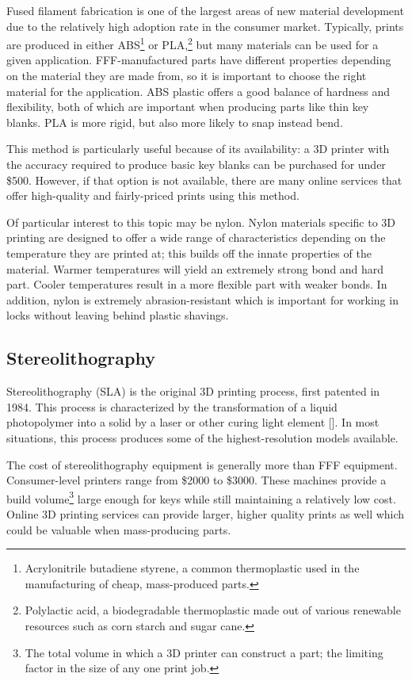 \documentclass{acm_proc_article-sp}
\begin{document}
Fused filament fabrication is one of the largest areas of new material development due to the relatively high adoption rate in the consumer market. Typically, prints are produced in either ABS\footnote{Acrylonitrile butadiene styrene, a common thermoplastic used in the manufacturing of cheap, mass-produced parts.} or PLA,\footnote{Polylactic acid, a biodegradable thermoplastic made out of various renewable resources such as corn starch and sugar cane.} but many materials can be used for a given application. FFF-manufactured parts have different properties depending on the material they are made from, so it is important to choose the right material for the application. ABS plastic offers a good balance of hardness and flexibility, both of which are important when producing parts like thin key blanks. PLA is more rigid, but also more likely to snap instead bend.

This method is particularly useful because of its availability: a 3D printer with the accuracy required to produce basic key blanks can be purchased for under \$500. However, if that option is not available, there are many online services that offer high-quality and fairly-priced prints using this method.

Of particular interest to this topic may be nylon. Nylon materials specific to 3D printing are designed to offer a wide range of characteristics depending on the temperature they are printed at; this builds off the innate properties of the material. Warmer temperatures will yield an extremely strong bond and hard part. Cooler temperatures result in a more flexible part with weaker bonds. In addition, nylon is extremely abrasion-resistant which is important for working in locks without leaving behind plastic shavings.

\subsection{Stereolithography}
Stereolithography (SLA) is the original 3D printing process, first patented in 1984. This process is characterized by the transformation of a liquid photopolymer into a solid by a laser or other curing light element [\citealt{HULL}]. In most situations, this process produces some of the highest-resolution models available.

The cost of stereolithography equipment is generally more than FFF equipment. Consumer-level printers range from \$2000 to \$3000. These machines provide a build volume\footnote{The total volume in which a 3D printer can construct a part; the limiting factor in the size of any one print job.} large enough for keys while still maintaining a relatively low cost. Online 3D printing services can provide larger, higher quality prints as well which could be valuable when mass-producing parts.
\end{document}
